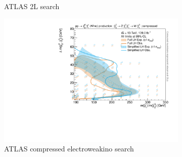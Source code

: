 \begin{figure}
\begin{subfigure}[b]{0.5\textwidth}
		\caption{ATLAS 2L search~\cite{SUSY-2018-32}}
	\end{subfigure}\hfill
	\begin{subfigure}[b]{0.5\textwidth}
		\centering\includegraphics[width=\textwidth]{exclusion_compressed_CLs_noLabel}
		\caption{ATLAS compressed electroweakino search~\cite{SUSY-2018-16}}
	\end{subfigure}\hfill
	\caption{}\label{fig:app_results_analyses}
\end{figure}